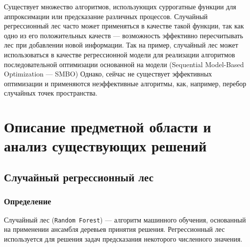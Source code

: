 \documentclass[pscyr,specification,annotation]{itmo-student-thesis}
\begin{document}





\tableofcontents

\startprefacepage

Существует множество алгоритмов, использующих суррогатные функции для
аппроксимации или предсказание различных процессов. Случайный регрессионный лес
часто может применяться в качестве такой функции, так как одно из его
положительных качеств --- возможность эффективно пересчитывать лес при
добавлении новой информации. Так на пример, случайный лес может использоваться
в качестве регрессионной модели для реализации алгоритмов последовательной
оптимизации основанной на модели (Sequential Model-Based Optimization --- SMBO\cite{bro})
Однако, сейчас не существует эффективных оптимизации и применяются неэффективные
алгоритмы, как, например, перебор случайных точек пространства.

\chapter{Описание предметной области и анализ существующих решений}

\section{Случайный регрессионный лес}\label{sec:random_forest}
\subsection{Определение}
Случайный лес (\texttt{Random Forest})\cite{randomforest} --- алгоритм машинного обучения,
основанный на применении ансамбля деревьев принятия решения. Регрессионный лес
используется для решения задач предсказания некоторого численного значения.
\end{document}
